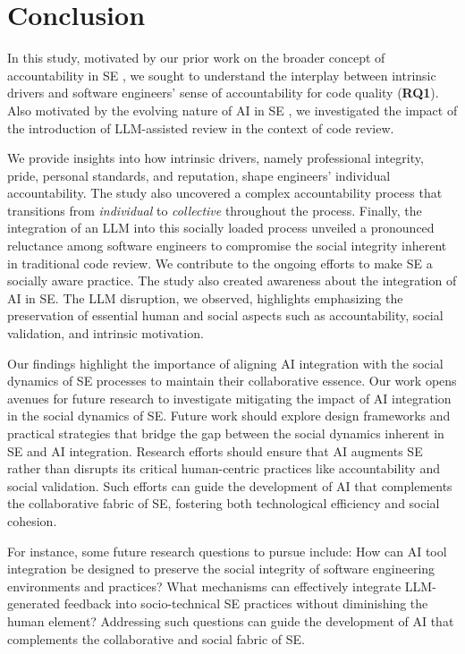 \section{Conclusion}\label{sec:conclusion}

\noindent In this study, motivated by our prior work on the broader concept of accountability in SE \cite{alami2024understanding}, we sought to understand the interplay between intrinsic drivers and software engineers' sense of accountability for code quality (\textbf{RQ1}). Also motivated by the evolving nature of AI in SE \cite{fan2023large}, we investigated the impact of the introduction of LLM-assisted review in the context of code review.

We provide insights into how intrinsic drivers, namely professional integrity, pride, personal standards, and reputation, shape engineers' individual accountability. The study also uncovered a complex accountability process that transitions from \emph{individual} to \emph{collective} throughout the process. Finally, the integration of an LLM into this socially loaded process unveiled a pronounced reluctance among software engineers to compromise the social integrity inherent in traditional code review. We contribute to the ongoing efforts to make SE a socially aware practice. The study also created awareness about the integration of AI in SE. The LLM disruption, we observed, highlights emphasizing the preservation of essential human and social aspects such as accountability, social validation, and intrinsic motivation.

Our findings highlight the importance of aligning AI integration with the social dynamics of SE processes to maintain their collaborative essence. Our work opens avenues for future research to investigate mitigating the impact of AI integration in the social dynamics of SE. Future work should explore design frameworks and practical strategies that bridge the gap between the social dynamics inherent in SE and AI integration. Research efforts should ensure that AI augments SE rather than disrupts its critical human-centric practices like accountability and social validation. Such efforts can guide the development of AI that complements the collaborative fabric of SE, fostering both technological efficiency and social cohesion.

For instance, some future research questions to pursue include: How can AI tool integration be designed to preserve the social integrity of software engineering environments and practices? What mechanisms can effectively integrate LLM-generated feedback into socio-technical SE practices without diminishing the human element? Addressing such questions can guide the development of AI that complements the collaborative and social fabric of SE.

